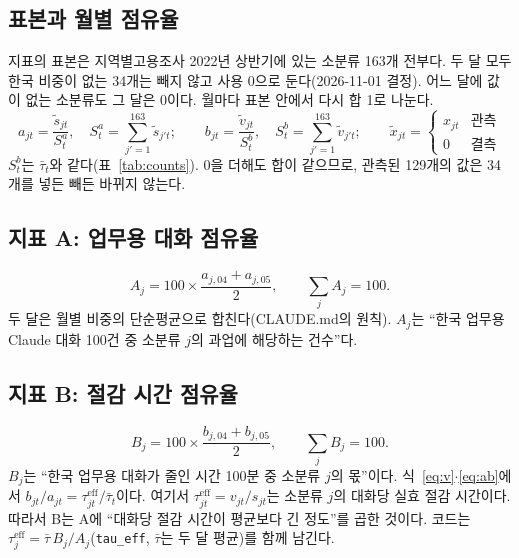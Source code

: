\documentclass[11pt]{article}
\begin{document}
\subsection{표본과 월별 점유율}

지표의 표본은 지역별고용조사 2022년 상반기에 있는 소분류 163개 전부다. 두 달 모두 한국 비중이 없는 34개는 빼지 않고 사용 0으로 둔다(2026-11-01 결정). 어느 달에 값이 없는 소분류도 그 달은 0이다. 월마다 표본 안에서 다시 합 1로 나눈다.
\begin{equation}
a_{jt} = \frac{\tilde s_{jt}}{S^a_t}, \quad S^a_t = \sum_{j'=1}^{163} \tilde s_{j't}; \qquad
b_{jt} = \frac{\tilde v_{jt}}{S^b_t}, \quad S^b_t = \sum_{j'=1}^{163} \tilde v_{j't}; \qquad
\tilde x_{jt} = \begin{cases} x_{jt} & \text{관측} \\ 0 & \text{결측} \end{cases}
\label{eq:ab}
\end{equation}
$S^b_t$는 $\bar\tau_t$와 같다(표~\ref{tab:counts}). 0을 더해도 합이 같으므로, 관측된 129개의 값은 34개를 넣든 빼든 바뀌지 않는다.

\subsection{지표 A: 업무용 대화 점유율}

\begin{equation}
A_j = 100 \times \frac{a_{j,04} + a_{j,05}}{2}, \qquad \sum_j A_j = 100.
\label{eq:A}
\end{equation}
두 달은 월별 비중의 단순평균으로 합친다(CLAUDE.md의 원칙). $A_j$는 ``한국 업무용 Claude 대화 100건 중 소분류 $j$의 과업에 해당하는 건수''다.

\subsection{지표 B: 절감 시간 점유율}

\begin{equation}
B_j = 100 \times \frac{b_{j,04} + b_{j,05}}{2}, \qquad \sum_j B_j = 100.
\label{eq:B}
\end{equation}
$B_j$는 ``한국 업무용 대화가 줄인 시간 100분 중 소분류 $j$의 몫''이다. 식~\eqref{eq:v}$\cdot$\eqref{eq:ab}에서 $b_{jt} / a_{jt} = \tau^{\text{eff}}_{jt} / \bar\tau_t$이다. 여기서 $\tau^{\text{eff}}_{jt} = v_{jt} / s_{jt}$는 소분류 $j$의 대화당 실효 절감 시간이다. 따라서 B는 A에 ``대화당 절감 시간이 평균보다 긴 정도''를 곱한 것이다. 코드는 $\tau^{\text{eff}}_j = \bar\tau\, B_j / A_j$(\texttt{tau\_eff}, $\bar\tau$는 두 달 평균)를 함께 남긴다.
\end{document}
